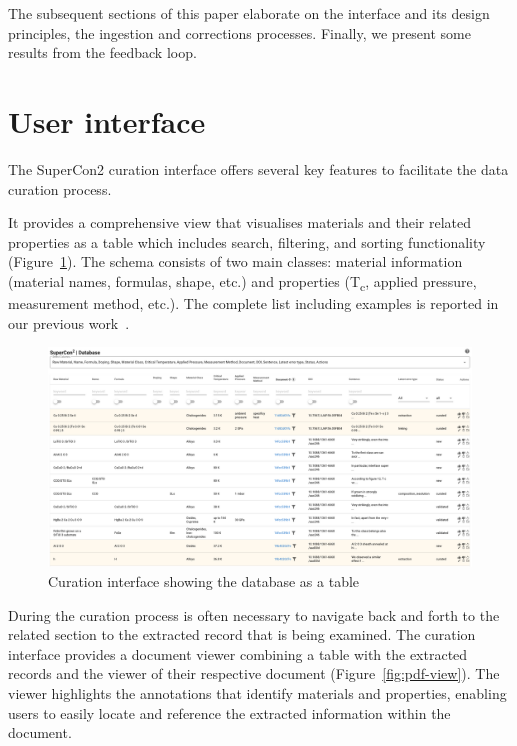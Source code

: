 \documentclass[a4paper]{article}
\begin{document}
The subsequent sections of this paper elaborate on the interface and its design principles, the ingestion and corrections processes. Finally, we present some results from the feedback loop. 

\section{User interface}

The SuperCon2 curation interface offers several key features to facilitate the data curation process.

It provides a comprehensive view that visualises materials and their related properties as a table which includes search, filtering, and sorting functionality (Figure~\ref{fig:curation-interface-database}). 
The schema consists of two main classes: material information (material names, formulas, shape, etc.) and properties (T\textsubscript{c}, applied pressure, measurement method, etc.). The complete list including examples is reported in our previous work~\cite{lfoppiano2023automatic}.

\begin{figure}[t]
  \centering
  \includegraphics[width=1\textwidth]{images/supercon-curation-database} 
  \caption{Curation interface showing the database as a table}
  \label{fig:curation-interface-database}
\end{figure}


During the curation process is often necessary to navigate back and forth to the related section to the extracted record that is being examined. The curation interface provides a document viewer combining a table with the extracted records and the viewer of their respective document (Figure~\ref{fig:pdf-view}). The viewer highlights the annotations that identify materials and properties, enabling users to easily locate and reference the extracted information within the document.
\end{document}
